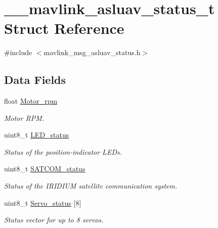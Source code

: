 \hypertarget{struct____mavlink__asluav__status__t}{\section{\+\_\+\+\_\+mavlink\+\_\+asluav\+\_\+status\+\_\+t Struct Reference}
\label{struct____mavlink__asluav__status__t}
}


{\ttfamily \#include $<$mavlink\+\_\+msg\+\_\+asluav\+\_\+status.\+h$>$}

\subsection*{Data Fields}
\begin{DoxyCompactItemize}
\item 
float \hyperlink{struct____mavlink__asluav__status__t_acb0d034b8d437dbc8830268736acb400}{Motor\+\_\+rpm}
\begin{DoxyCompactList}\small\item\em Motor R\+P\+M. \end{DoxyCompactList}\item 
uint8\+\_\+t \hyperlink{struct____mavlink__asluav__status__t_ac0adbb11d423f7ca357fd4f515c63a25}{L\+E\+D\+\_\+status}
\begin{DoxyCompactList}\small\item\em Status of the position-\/indicator L\+E\+Ds. \end{DoxyCompactList}\item 
uint8\+\_\+t \hyperlink{struct____mavlink__asluav__status__t_a04f9a5070775926d4895bd81d699e8b3}{S\+A\+T\+C\+O\+M\+\_\+status}
\begin{DoxyCompactList}\small\item\em Status of the I\+R\+I\+D\+I\+U\+M satellite communication system. \end{DoxyCompactList}\item 
uint8\+\_\+t \hyperlink{struct____mavlink__asluav__status__t_a2c305b7b0a1a08c3f6b114149d968ca6}{Servo\+\_\+status} \mbox{[}8\mbox{]}
\begin{DoxyCompactList}\small\item\em Status vector for up to 8 servos. \end{DoxyCompactList}\end{DoxyCompactItemize}



